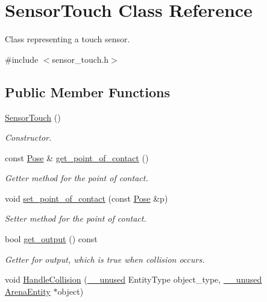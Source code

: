 \hypertarget{classSensorTouch}{}\section{Sensor\+Touch Class Reference}
\label{classSensorTouch}


Class representing a touch sensor.  




{\ttfamily \#include $<$sensor\+\_\+touch.\+h$>$}

\subsection*{Public Member Functions}
\begin{DoxyCompactItemize}
\item 
\hyperlink{classSensorTouch_ab8e0dc693ec2fbc1aa5ff25ee2bfdb19}{Sensor\+Touch} ()\hypertarget{classSensorTouch_ab8e0dc693ec2fbc1aa5ff25ee2bfdb19}{}\label{classSensorTouch_ab8e0dc693ec2fbc1aa5ff25ee2bfdb19}

\begin{DoxyCompactList}\small\item\em Constructor. \end{DoxyCompactList}\item 
const \hyperlink{structPose}{Pose} \& \hyperlink{classSensorTouch_a9f56fd943758125611863ce2bc0d9365}{get\+\_\+point\+\_\+of\+\_\+contact} ()
\begin{DoxyCompactList}\small\item\em Getter method for the point of contact. \end{DoxyCompactList}\item 
void \hyperlink{classSensorTouch_a2ef6d89a8e763e21f82e03a3033a490f}{set\+\_\+point\+\_\+of\+\_\+contact} (const \hyperlink{structPose}{Pose} \&p)
\begin{DoxyCompactList}\small\item\em Setter method for the point of contact. \end{DoxyCompactList}\item 
bool \hyperlink{classSensorTouch_a6a2f77ea46d008f4a058bfb24db742e0}{get\+\_\+output} () const \hypertarget{classSensorTouch_a6a2f77ea46d008f4a058bfb24db742e0}{}\label{classSensorTouch_a6a2f77ea46d008f4a058bfb24db742e0}

\begin{DoxyCompactList}\small\item\em Getter for output, which is true when collision occurs. \end{DoxyCompactList}\item 
void \hyperlink{classSensorTouch_a1980b126f7c6d0e6bdf75f1bb59fe5c2}{Handle\+Collision} (\hyperlink{common_8h_a2e3484535ee610c8e19e9859563abe48}{\+\_\+\+\_\+unused} Entity\+Type object\+\_\+type, \hyperlink{common_8h_a2e3484535ee610c8e19e9859563abe48}{\+\_\+\+\_\+unused} \hyperlink{classArenaEntity}{Arena\+Entity} $\ast$object)\hypertarget{classSensorTouch_a1980b126f7c6d0e6bdf75f1bb59fe5c2}{}\label{classSensorTouch_a1980b126f7c6d0e6bdf75f1bb59fe5c2}


\end{DoxyCompactItemize}

